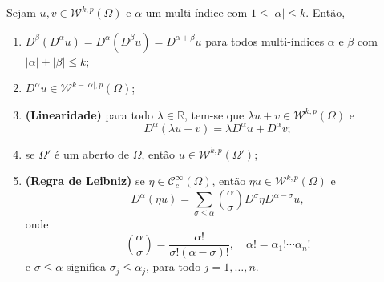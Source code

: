 \documentclass[a4paper, 11pt]{book}
\theoremstyle{definition}
\newcommand{\bR}{\mathbb{R}}
\newcommand{\cC}{\mathcal{C}}
\newcommand{\cW}{\mathcal{W}}
\begin{document}
\begin{tbox} \label{thm:propriedades-derivada-fraca}
    Sejam $u, v \in \cW^{k,p}(\Omega)$ e $\alpha$ um multi-índice com $1 \leqslant |\alpha| \leqslant k$.
    Então,
    \begin{enumerate}[leftmargin=*, label=\textbf{(\alph*)}]
        \item $D^\beta(D^\alpha u) = D^\alpha (D^\beta u) = D^{\alpha + \beta} u$ para todos multi-índices $\alpha$ e $\beta$ com $|\alpha| + |\beta| \leqslant k$;
        \item $D^\alpha u \in \cW^{k - |\alpha|,p}(\Omega)$;
        \item \textbf{(Linearidade)} para todo $\lambda \in \bR$, tem-se que $\lambda u + v \in \cW^{k,p}(\Omega)$ e
        \[
            D^{\alpha}(\lambda u + v) = \lambda D^\alpha u + D^\alpha v;
        \]
        \item se $\Omega'$ é um aberto de $\Omega$, então $u \in \cW^{k,p}(\Omega')$;
        \item \textbf{(Regra de Leibniz)} se $\eta \in \cC^\infty_c(\Omega)$, então $\eta u \in \cW^{k,p}(\Omega)$ e
        \begin{equation} \label{eq:regra-de-leibniz}
            D^\alpha (\eta u) = \sum_{\sigma \leqslant \alpha} \binom{\alpha}{\sigma} D^{\sigma} \eta D^{\alpha - \sigma} u,
        \end{equation}
        onde
        \[
            \binom{\alpha}{\sigma} = \frac{\alpha!}{\sigma!(\alpha - \sigma)!}, \quad \alpha! = \alpha_1!\cdots \alpha_n!
        \]
        e $\sigma \leqslant \alpha$ significa $\sigma_j \leqslant \alpha_j$, para todo $j = 1,\dots,n$.
    \end{enumerate}
\end{tbox}
\end{document}
